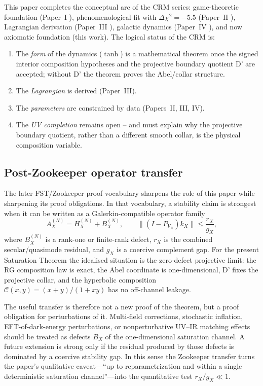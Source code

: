 \documentclass[aps,prd,twocolumn,superscriptaddress,nofootinbib]{revtex4-2}
\begin{document}
This paper completes the conceptual arc of the CRM series: game-theoretic foundation (Paper~I \cite{Geiger2026}), phenomenological fit with $\Delta\chi^2 = -5.5$ (Paper~II \cite{Geiger2026b}), Lagrangian derivation (Paper~III \cite{Geiger2026c}), galactic dynamics (Paper~IV \cite{Geiger2026d}), and now axiomatic foundation (this work). The logical status of the CRM is:
\begin{enumerate}
\item The \textit{form} of the dynamics ($\tanh$) is a mathematical theorem once the signed interior composition hypotheses and the projective boundary quotient D' are accepted; without D' the theorem proves the Abel/collar structure.
\item The \textit{Lagrangian} is derived (Paper~III).
\item The \textit{parameters} are constrained by data (Papers~II, III, IV).
\item The \textit{UV completion} remains open -- and must explain why the projective boundary quotient, rather than a different smooth collar, is the physical composition variable.
\end{enumerate}

\subsection{Post-Zookeeper operator transfer}

The later FST/Zookeeper proof vocabulary sharpens the role of this
paper while sharpening its proof obligations.  In that vocabulary, a stability
claim is strongest when it can be written as a Galerkin-compatible
operator family
\[
  A_X^{(N)} = H_X^{(N)} + B_X^{(N)}, \qquad
  \|(I-P_{V_X})k_X\| \leq \frac{r_X}{g_X},
\]
where $B_X^{(N)}$ is a rank-one or finite-rank defect, $r_X$ is the
combined secular/quasimode residual, and $g_X$ is a coercive complement
gap.  For the present Saturation Theorem the idealised situation is the
zero-defect projective limit: the RG composition law is exact, the Abel coordinate
is one-dimensional, D' fixes the projective collar, and the hyperbolic composition
$\mathcal{C}(x,y)=(x+y)/(1+xy)$ has no off-channel leakage.

The useful transfer is therefore not a new proof of the theorem, but a
proof obligation for perturbations of it.  Multi-field corrections,
stochastic inflation, EFT-of-dark-energy perturbations, or
nonperturbative UV--IR matching effects should be treated as defects
$B_X$ of the one-dimensional saturation channel.  A future extension is
strong only if the residual produced by those defects is dominated by a
coercive stability gap.  In this sense the Zookeeper transfer turns the
paper's qualitative caveat---``up to reparametrization and within a
single deterministic saturation channel''---into the quantitative test
$r_X/g_X \ll 1$.
\end{document}
